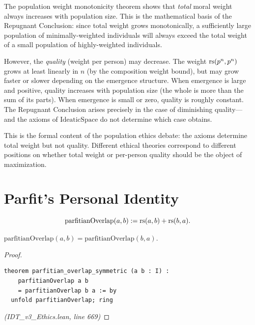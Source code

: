 \begin{interpretation}
The population weight monotonicity theorem shows that \emph{total} moral
weight always increases with population size. This is the mathematical
basis of the Repugnant Conclusion: since total weight grows monotonically,
a sufficiently large population of minimally-weighted individuals will
always exceed the total weight of a small population of highly-weighted
individuals.

However, the \emph{quality} (weight per person) may decrease. The weight
$\mathrm{rs}(p^n, p^n)$ grows at least linearly in $n$ (by the composition
weight bound), but may grow faster or slower depending on the emergence
structure. When emergence is large and positive, quality increases with
population size (the whole is more than the sum of its parts). When emergence
is small or zero, quality is roughly constant. The Repugnant Conclusion
arises precisely in the case of diminishing quality---and the axioms of
$\mathrm{IdeaticSpace}$ do not determine which case obtains.

This is the formal content of the population ethics debate: the axioms
determine total weight but not quality. Different ethical theories
correspond to different positions on whether total weight or per-person
quality should be the object of maximization.
\end{interpretation}

\section{Parfit's Personal Identity}

\begin{definition}
\label{def:parfit-overlap}
\[
  \mathrm{parfitianOverlap}(a, b) := \mathrm{rs}(a, b) + \mathrm{rs}(b, a).
\]
\end{definition}

\begin{theorem}
\label{thm:parfit-symmetric}
$\mathrm{parfitianOverlap}(a, b) = \mathrm{parfitianOverlap}(b, a)$.
\end{theorem}

\begin{proof}
\begin{lstlisting}
theorem parfitian_overlap_symmetric (a b : I) :
    parfitianOverlap a b
    = parfitianOverlap b a := by
  unfold parfitianOverlap; ring
\end{lstlisting}
\textit{(IDT\_v3\_Ethics.lean, line 669)}
\end{proof}

